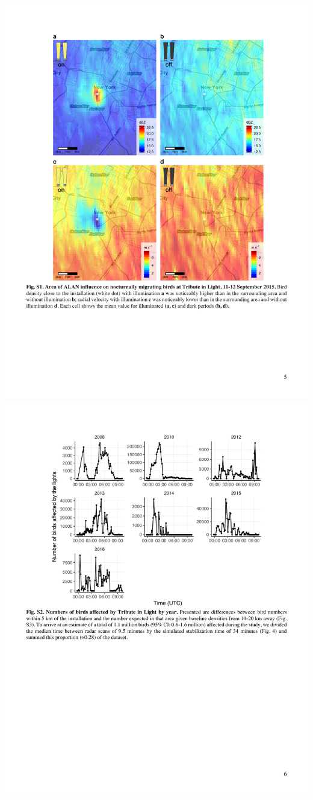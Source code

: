 \documentclass[a4paper, twoside]{templates/ociamthesis}
\begin{document}
\includegraphics[width=1\linewidth]{pdf_chapters/lights/lights_supp_crop_Part09}
\includegraphics[width=1\linewidth]{pdf_chapters/lights/lights_supp_crop_Part10}
\end{document}
